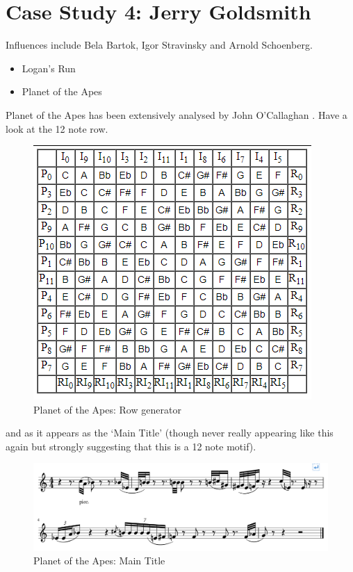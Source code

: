 \section{Case Study 4: Jerry Goldsmith}
Influences include Bela Bartok, Igor Stravinsky and Arnold Schoenberg. 
\begin{itemize}
\item Logan's Run
\item Planet of the Apes
\end{itemize}
Planet of the Apes has been extensively analysed by John O'Callaghan \citep{o2015simians}. Have a look at the 12 note row.

\begin{figure}[H]
\centering
\includegraphics[scale=2.0]{potarow} \caption{Planet of the Apes: Row generator}
\label{fig:potarow}
\end{figure}

and as it appears as the `Main Title' (though never really appearing like this again but strongly suggesting that this is a 12 note motif).

\begin{figure}[H]
\centering
\includegraphics[scale=0.8]{potamaintheme}\caption{Planet of the Apes: Main Title}
\label{fig:potamaintheme}
\end{figure}



